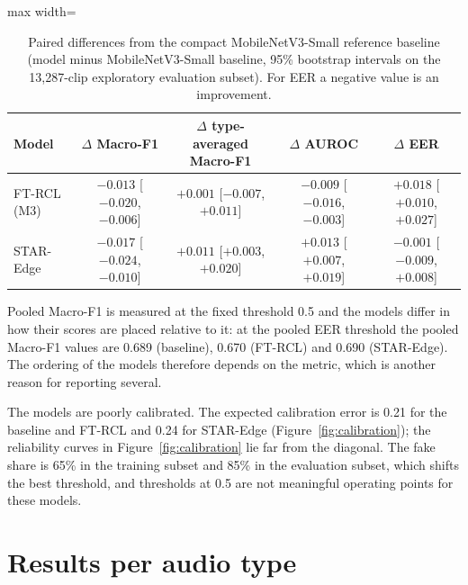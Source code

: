\begin{table}[htbp]
\centering
\caption{Paired differences from the compact MobileNetV3-Small reference baseline (model minus MobileNetV3-Small baseline, 95\% bootstrap intervals on the 13{,}287-clip exploratory evaluation subset). For EER a negative value is an improvement.}
\label{tab:paired}
\small
\begin{adjustbox}{max width=\textwidth}
\begin{tabular}{@{}lcccc@{}}
\toprule
Model & $\Delta$ Macro-F1 & $\Delta$ type-averaged Macro-F1 & $\Delta$ AUROC & $\Delta$ EER \\
\midrule
FT-RCL (M3) & $-0.013$ [$-0.020$, $-0.006$] & $+0.001$ [$-0.007$, $+0.011$] & $-0.009$ [$-0.016$, $-0.003$] & $+0.018$ [$+0.010$, $+0.027$] \\
STAR-Edge & $-0.017$ [$-0.024$, $-0.010$] & $+0.011$ [$+0.003$, $+0.020$] & $+0.013$ [$+0.007$, $+0.019$] & $-0.001$ [$-0.009$, $+0.008$] \\
\bottomrule
\end{tabular}
\end{adjustbox}
\end{table}

Pooled Macro-F1 is measured at the fixed threshold 0.5 and the models differ in how their scores are placed relative to it: at the pooled EER threshold the pooled Macro-F1 values are 0.689 (baseline), 0.670 (FT-RCL) and 0.690 (STAR-Edge). The ordering of the models therefore depends on the metric, which is another reason for reporting several.

The models are poorly calibrated. The expected calibration error is 0.21 for the baseline and FT-RCL and 0.24 for STAR-Edge (Figure~\ref{fig:calibration}); the reliability curves in Figure~\ref{fig:calibration} lie far from the diagonal. The fake share is 65\% in the training subset and 85\% in the evaluation subset, which shifts the best threshold, and thresholds at 0.5 are not meaningful operating points for these models.



\section{Results per audio type}
\label{sec:per-type}

